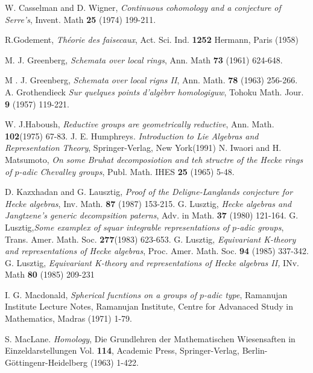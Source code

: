 \begin{thebibliography}{99}
 W. Casselman and D. Wigner, \textit{Continuous cohomology and a conjecture of Serre's}, Invent. Math {\bf 25} (1974) 199-211.

 R.Godement, \textit{Th\'eorie des faisecaux}, Act. Sci. Ind. {\bf 1252} Hermann, Paris (1958)

 M. J. Greenberg, \textit{Schemata over local rings}, Ann. Math {\bf 73} (1961) 624-648.

 M . J. Greenberg, \textit{Schemata over local rigns II}, Ann. Math. {\bf 78} (1963)
256-266.
 A. Grothendieck \textit{Sur quelques points d'alg\`ebrr homologiguw}, Tohoku  Math. Jour. {\bf 9} (1957) 119-221.

 W. J.Haboush, \textit{Reductive groups are geometrically reductive}, Ann. Math. {\bf 102}(1975) 67-83. 
 J. E. Humphreys. \textit{Introduction to Lie Algebras and Representation Theory}, Springer-Verlag, New York(1991)
 N. Iwaori and H. Matsumoto, \textit{On some Bruhat decomposiotion and teh structre of the Hecke rings of $p$-adic Chevalley groups}, Publ. Math. IHES {\bf 25} (1965) 5-48.

 D. Kazxhadan and G. Lausztig, \textit{Proof of the Deligne-Langlands conjecture for Hecke algebras}, Inv. Math. {\bf 87} (1987) 153-215.
 G. Lusztig, \textit{Hecke algebras and Jangtzene's generic decompsition paterns}, Adv. in Math. {\bf 37} (1980) 121-164.
 G. Lusztig,\textit{Some examplex of squar integrable representations of $p$-adic groups}, Trans. Amer. Math. Soc. {\bf 277}(1983) 623-653.
 G. Lusztig, \textit{Equivariant K-theory and representations of Hecke algebras}, Proc. Amer. Math. Soc. {\bf 94} (1985) 337-342.
 G. Lusztig, \textit{Equivariant K-theory and representations of Hecke algebras II,} INv. Math
{\bf 80} (1985) 209-231

 I. G. Macdonald, \textit{Spherical fucntions on a groups of $p$-adic type}, Ramanujan Institute Lecture Notes, Ramanujan Institute, Centre for Advanaced Study in Mathematics, Madras (1971) 1-79.

 S. MacLane. \textit{Homology}, Die Grundlehren der Mathematischen Wiesensaften in Einzeldarstellungen Vol. {\bf 114}, Academic Press, Springer-Verlag, Berlin-G\"ottingenr-Heidelberg (1963) 1-422.


\end{thebibliography}
